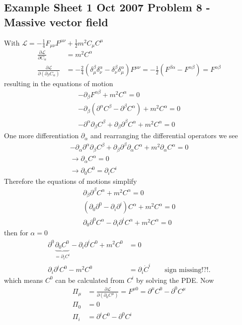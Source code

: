 \documentclass[../main.tex]{subfiles}
\begin{document}
\subsection{Example Sheet 1 Oct 2007 Problem 8 - Massive vector field}

With $\mathcal{L}=-\frac{1}{4}F_{\mu\nu}F^{\mu\nu}+\frac{1}{2}m^2C_\mu C^\mu$
\begin{align}
\frac{\partial\mathcal{L}}{\partial C_\alpha}&=m^2C^\alpha\\
\frac{\partial\mathcal{L}}{\partial(\partial_\beta C_\alpha)}&=-\frac{2}{4}(\delta^\beta_\mu\delta^\alpha_\nu-\delta^\beta_\nu\delta^\alpha_\mu)F^{\mu\nu}=-\frac{1}{2}(F^{\beta\alpha}-F^{\alpha\beta})=F^{\alpha\beta}
\end{align}
resulting in the equations of motion
\begin{align}
-\partial_\beta F^{\alpha\beta}+m^2C^\alpha=0\\
-\partial_\beta (\partial^\alpha C^\beta-\partial^\beta C^\alpha)+m^2C^\alpha=0\\
-\partial^\alpha \partial_\beta C^\beta+\partial_\beta\partial^\beta C^\alpha+m^2C^\alpha=0
\end{align}
One more differentiation $\partial_\alpha$ and rearranging the differential operators we see
\begin{align}
-\partial_\alpha\partial^\alpha\partial_\beta C^\beta+\partial_\beta\partial^\beta \partial_\alpha C^\alpha+m^2\partial_\alpha C^\alpha=0\\
\rightarrow\partial_\alpha C^\alpha=0\\
\rightarrow\partial_0C^0=\partial_iC^i
\end{align}
Therefore the equations of motions simplify
\begin{align}
\partial_\beta\partial^\beta C^\alpha+m^2C^\alpha=0\\
(\partial_0\partial^0-\partial_i\partial^i) C^\alpha+m^2C^\alpha=0\\
\partial_0\partial^0C^\alpha-\partial_i\partial^i C^\alpha+m^2C^\alpha=0
\end{align}
then for $\alpha=0$
\begin{align}
\partial^0\underbrace{\partial_0C^0}_{=\partial_iC^i}-\partial_i\partial^i C^0+m^2C^0&=0\\
\partial_i\partial^i C^0-m^2C^0&=\partial_i\dot{C}^i\qquad\text{sign missing!?!}.
\end{align}
which means $C^0$ can be calculated from $C^i$ by solving the PDE. Now
\begin{align}
\Pi_\mu
&=\frac{\partial\mathcal{L}}{\partial(\partial_0C^\mu)}=F^{\mu0}=\partial^\mu C^0-\partial^0C^\mu\\
\Pi_0&=0\\
\Pi_i&=\partial^iC^0-\partial^0C^i
\end{align}
\end{document}
